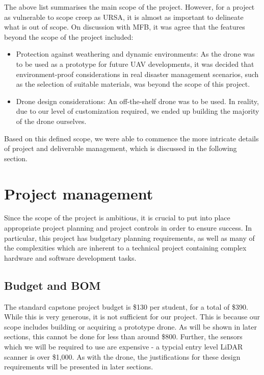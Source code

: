 \documentclass[capstone_report.tex]{subfiles}
\begin{document}
The above list summarises the main scope of the project. However, for a project as vulnerable to scope creep as URSA, it is almost as important to delineate what is out of scope. On discussion with MFB, it was agree that the features beyond the scope of the project included:
\begin{itemize}
	\item Protection against weathering and dynamic environments: As the drone was to be used as a prototype for future UAV developments, it was decided that environment-proof considerations in real disaster management scenarios, such as the selection of suitable materials, was beyond the scope of this project.
 \item Drone design considerations: An off-the-shelf drone was to be used. In reality, due to our level of customization required, we ended up building the majority of the drone ourselves.
\end{itemize}

Based on this defined scope, we were able to commence the more intricate details of project and deliverable management, which is discussed in the following section.


\section{Project management}
	Since the scope of the project is ambitious, it is crucial to put into place appropriate project planning and project controls in order to ensure success. In particular, this project has budgetary planning requirements, as well as many of the complexities which are inherent to a technical project containing complex hardware and software development tasks. 

\subsection{Budget and BOM}
	The standard capstone project budget is \$130 per student, for a total of \$390. While this is very generous, it is not sufficient for our project. This is because our scope includes building or acquiring a prototype drone. As will be shown in later sections, this cannot be done for less than around \$800. Further, the sensors which we will be required to use are expensive - a typcial entry level LiDAR scanner is over \$1,000. As with the drone, the justifications for these design requirements will be presented in later sections.\\
\end{document}

